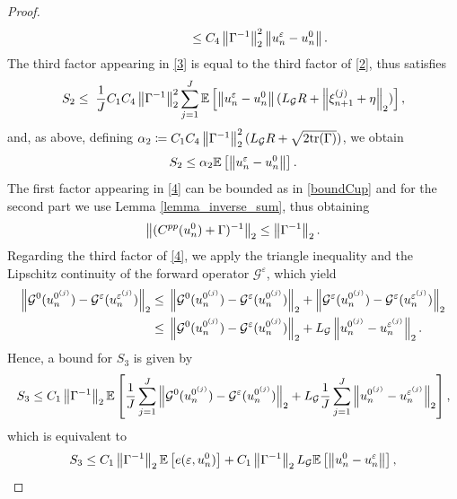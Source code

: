 \documentclass[10pt]{article}
\begin{document}
{\begin{proof}
\begin{align*}
& \hspace{50pt} \le C_4 \left\|\Gamma^{-1}\right\|_2^2  \left\|u_n^{\varepsilon} - u_n^0\right\|.
\end{align*}
The third factor appearing in \eqref{3} is equal to the third factor of \eqref{2}, thus  satisfies
\begin{equation*}
S_2 \leq \; \frac{1}{J} C_1 C_4 \left\|\Gamma^{-1}\right\|_2^2 \sum_{j=1}^J \mathbb{E} \left [ \left\|u_n^{\varepsilon} - u_n^0\right\| (L_{\mathcal{G}} R + \left\|\xi_{n+1}^{(j)} + \eta\right\|_2) \right ],
\end{equation*}
and, as above, defining $\alpha_2 \coloneqq C_1 C_4 \left\|\Gamma^{-1}\right\|_2^2 (L_{\mathcal{G}} R + \sqrt{2\mathrm{tr}(\Gamma)})$, we obtain
\begin{equation}
\label{bound3}
S_2 \leq \alpha_2 \mathbb{E} \left [ \left\|u_n^{\varepsilon} - u_n^0\right\| \right ].
\end{equation}
 The first factor appearing in \eqref{4} can be bounded as in \eqref{boundCup} and for the second part we use Lemma \ref{lemma_inverse_sum}, thus obtaining
\begin{equation*}
\left\|(C^{pp}(u_n^0) + \Gamma)^{-1}\right\|_2 \le \left\|\Gamma^{-1}\right\|_2.
\end{equation*}
Regarding the third factor of \eqref{4}, we apply the triangle inequality and the Lipschitz continuity of the forward operator $\mathcal{G}^{\varepsilon}$, which yield
\begin{align*}
\left\|\mathcal{G}^0(u_n^{0^{(j)}}) - \mathcal{G}^{\varepsilon}(u_n^{\varepsilon^{(j)}})\right\|_2 \le & \; \left\|\mathcal{G}^0(u_n^{0^{(j)}}) - \mathcal{G}^{\varepsilon}(u_n^{0^{(j)}})\right\|_2 + \left\|\mathcal{G}^{\varepsilon}(u_n^{0^{(j)}}) - \mathcal{G}^{\varepsilon}(u_n^{\varepsilon^{(j)}})\right\|_2 \\
\le & \; \left\|\mathcal{G}^0(u_n^{0^{(j)}}) - \mathcal{G}^{\varepsilon}(u_n^{0^{(j)}})\right\|_2 + L_{\mathcal{G}} \left\|u_n^{0^{(j)}} - u_n^{\varepsilon^{(j)}}\right\|_2.
\end{align*}
Hence, a bound for $S_3$ is given by
\begin{equation*}
S_3 \leq C_1 \left\|\Gamma^{-1}\right\|_2 \mathbb{E} \left [ \frac{1}{J} \sum_{j=1}^J \left\|\mathcal{G}^0(u_n^{0^{(j)}}) - \mathcal{G}^{\varepsilon}(u_n^{0^{(j)}})\right\|_2 + L_{\mathcal{G}} \frac{1}{J} \sum_{j=1}^J \left\|u_n^{0^{(j)}} - u_n^{\varepsilon^{(j)}}\right\|_2 \right ],
\end{equation*}
which is equivalent to
\begin{equation*}
S_3 \leq C_1 \norm{\Gamma^{-1}}_2 \mathbb{E} \left [ e(\varepsilon, u_n^0) \right ] + C_1 \norm{\Gamma^{-1}}_2 L_{\mathcal{G}} \mathbb{E} \left [ \norm{u_n^0 - u_n^{\varepsilon}} \right ],

\end{equation*}
\end{proof}}
\end{document}
